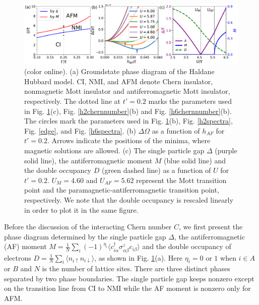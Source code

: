 \documentclass[12pt]{iopart}
\begin{document}
\begin{figure}
\centering
\includegraphics[scale=0.45]{phase}
\caption{(color online). (a) Groundstate phase diagram of the Haldane Hubbard model. CI, NMI, and AFM denote Chern insulator, nonmagnetic Mott insulator and antiferromagnetic Mott insulator, respectively. The dotted line at $t'=0.2$ marks the parameters used in Fig. \ref{phase}(c), Fig. \ref{h2chernnumber}(b) and Fig. \ref{h6chernnumber}(b). The circles mark the parameters used in Fig. \ref{phase}(b), Fig. \ref{h2spectra}, Fig. \ref{edge}, and Fig. \ref{h6spectra}. (b) $\Delta\Omega$ as a function of $h_{AF}$ for $t'=0.2$. Arrows indicate the positions of the minima, where magnetic solutions are allowed. (c) The single particle gap $\Delta$ (purple solid line), the antiferromagnetic moment $M$ (blue solid line) and the double occupancy $D$ (green dashed line) as a function of $U$ for $t'=0.2$. $U_M=4.60$ and $U_{AF}=5.62$ represent the Mott transition point and the paramagnetic-antiferromagnetic transition point, respectively. We note that the double occupancy is rescaled linearly in order to plot it in the same figure.} \label{phase}
\end{figure}

\par Before the discussion of the interacting Chern number $C$, we first present the phase diagram determined by the single particle gap $\Delta$, the antiferromagnetic (AF) moment $M=\frac{1}{N}\sum_i(-1)^{\eta_i}\langle c^\dagger_{i\alpha}\sigma^z_{\alpha\beta}c_{i\beta}\rangle$ and the double occupancy of electrons $D=\frac{1}{N}\sum_i\langle n_{i\uparrow}n_{i\downarrow}\rangle$, as shown in Fig. \ref{phase}(a). Here $\eta_i=0$ or $1$ when $i\in A$ or $B$ and $N$ is the number of lattice sites. There are three distinct phases separated by two phase boundaries. The single particle gap keeps nonzero except on the transition line from CI to NMI while the AF moment is nonzero only for AFM.
\end{document}
